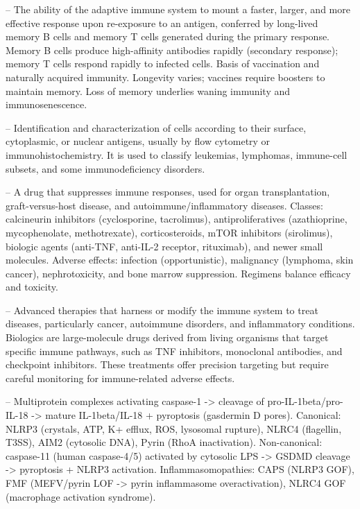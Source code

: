 -- The ability of the adaptive immune system to mount a faster, larger, and more effective response upon re-exposure to an antigen, conferred by long-lived memory B cells and memory T cells generated during the primary response. Memory B cells produce high-affinity antibodies rapidly (secondary response); memory T cells respond rapidly to infected cells. Basis of vaccination and naturally acquired immunity. Longevity varies; vaccines require boosters to maintain memory. Loss of memory underlies waning immunity and immunosenescence.

-- Identification and characterization of cells according to their surface, cytoplasmic, or nuclear antigens, usually by flow cytometry or immunohistochemistry. It is used to classify leukemias, lymphomas, immune-cell subsets, and some immunodeficiency disorders.

-- A drug that suppresses immune responses, used for organ transplantation, graft-versus-host disease, and autoimmune/inflammatory diseases. Classes: calcineurin inhibitors (cyclosporine, tacrolimus), antiproliferatives (azathioprine, mycophenolate, methotrexate), corticosteroids, mTOR inhibitors (sirolimus), biologic agents (anti-TNF, anti-IL-2 receptor, rituximab), and newer small molecules. Adverse effects: infection (opportunistic), malignancy (lymphoma, skin cancer), nephrotoxicity, and bone marrow suppression. Regimens balance efficacy and toxicity.

-- Advanced therapies that harness or modify the immune system to treat diseases, particularly cancer, autoimmune disorders, and inflammatory conditions. Biologics are large-molecule drugs derived from living organisms that target specific immune pathways, such as TNF inhibitors, monoclonal antibodies, and checkpoint inhibitors. These treatments offer precision targeting but require careful monitoring for immune-related adverse effects.

-- Multiprotein complexes activating caspase-1 -> cleavage of pro-IL-1beta/pro-IL-18 -> mature IL-1beta/IL-18 + pyroptosis (gasdermin D pores). Canonical: NLRP3 (crystals, ATP, K+ efflux, ROS, lysosomal rupture), NLRC4 (flagellin, T3SS), AIM2 (cytosolic DNA), Pyrin (RhoA inactivation). Non-canonical: caspase-11 (human caspase-4/5) activated by cytosolic LPS -> GSDMD cleavage -> pyroptosis + NLRP3 activation. Inflammasomopathies: CAPS (NLRP3 GOF), FMF (MEFV/pyrin LOF -> pyrin inflammasome overactivation), NLRC4 GOF (macrophage activation syndrome).

